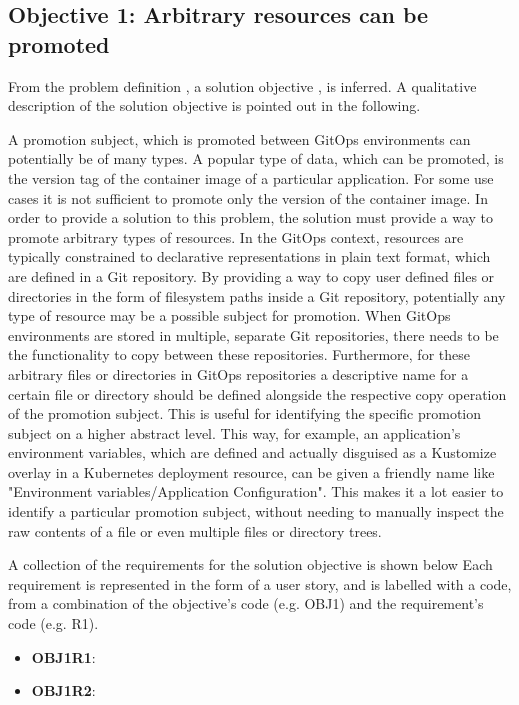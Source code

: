\subsection{Objective 1: Arbitrary resources can be promoted}
\label{objective1}

From the problem definition
\textbf{},
a solution objective
\textbf{},
is inferred.
A qualitative description of the solution objective
is pointed out in the following.

A promotion subject, which is promoted between GitOps environments can potentially
be of many types. A popular type of data, which can be promoted,
is the version tag of the container image of a particular application.
For some use cases it is not sufficient to promote only the version of the container image.
In order to provide a solution to this problem,
the solution must provide a way to promote arbitrary types of resources.
In the GitOps context, resources are typically constrained to declarative
representations in plain text format, which are defined in a Git repository.
By providing a way to copy user defined files or directories in the form
of filesystem paths inside a Git repository,
potentially any type of resource may be a possible subject for promotion.
When GitOps environments are stored in multiple, separate Git repositories,
there needs to be the functionality to copy between these repositories.
Furthermore, for these arbitrary files or directories in GitOps repositories
a descriptive name for a certain file or directory
should be defined alongside the
respective copy operation of the promotion subject.
This is useful for identifying the specific promotion subject
on a higher abstract level.
This way, for example, an application's environment variables,
which are defined and actually disguised as a Kustomize overlay in a Kubernetes deployment resource,
can be given a friendly name like "Environment variables/Application Configuration".
This makes it a lot easier to identify a particular promotion subject, without
needing to manually inspect the raw contents of a file or even multiple files or
directory trees.

A collection of the requirements for the solution objective is shown below
Each requirement is represented in the form of a user story,
and is labelled with a code, from a combination of the
objective's code (e.g. OBJ1) and the requirement's code (e.g. R1).

\begin{itemize}
	\item \textbf{OBJ1R1}: 
	\item \textbf{OBJ1R2}: 
\end{itemize}

